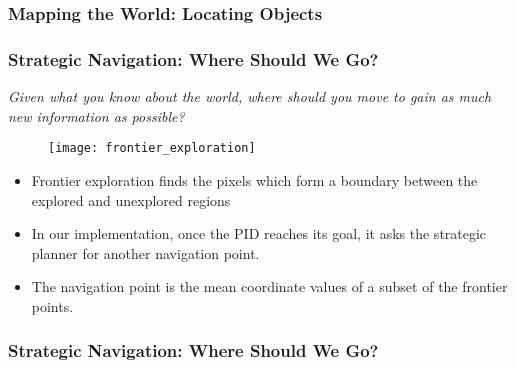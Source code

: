 \documentclass[aspectratio=169]{beamer}
\begin{document}

\begin{frame}
\frametitle{Mapping the World: Locating Objects}
\begin{center}
\end{center}
\end{frame}


\begin{frame}
\frametitle{Strategic Navigation: Where Should We Go?}
\begin{center}
\footnotesize\textit{Given what you know about the world, where should you move to gain as much new information as possible?}
\end{center}
\begin{minipage}{0.45\textwidth}
\begin{figure}
\centering
\texttt{[image: frontier\_exploration]}
\end{figure}
\end{minipage}
\begin{minipage}{0.45\textwidth}
\begin{itemize}
\item Frontier exploration finds the pixels which form a boundary between the explored and unexplored regions
\vspace{0.35cm}
\item In our implementation, once the PID reaches its goal, it asks the strategic planner for another navigation point.
\vspace{0.35cm}
\item The navigation point is the mean coordinate values of a subset of the frontier points.
\end{itemize}
\end{minipage}
\end{frame}


\begin{frame}
\frametitle{Strategic Navigation: Where Should We Go?}
\begin{center}
\end{center}
\end{frame}
\end{document}
